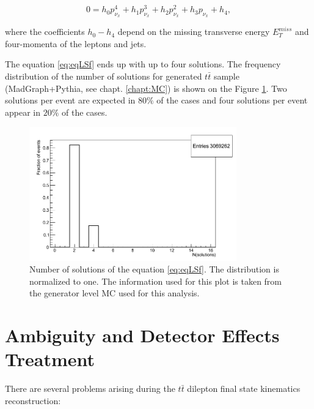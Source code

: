 \begin{equation}\label{eq:eqLSf}
 0 = h_{0} p_{\nu_{x}}^{4} + h_{1} p_{\nu_{x}}^{3} + h_{2} p_{\nu_{x}}^{2} + h_{3} p_{\nu_{x}} + h_{4},
\end{equation}

where the coefficients $h_{0} - h_{4}$ \cite{LSpaper, LSerrat} depend on the missing transverse energy $E_{T}^{miss}$ and four-momenta of the
leptons and jets. 

The equation \ref{eq:eqLSf} ends up with up to four solutions. The frequency distribution of the number of solutions for generated $t\bar{t}$ sample (MadGraph+Pythia,
see chapt. \ref{chapt:MC}) is shown on the Figure \ref{fig:LSNsol}. Two solutions per event are expected in 80$\%$ of the cases and four solutions per event appear in 
$20\%$ of the cases.

\begin{figure}[t]
  \centering
  \includegraphics[width=0.8\textwidth]{05_kinReco/plots/KinReco_Nsolutions.png}
  \caption{Number of solutions of the equation \ref{eq:eqLSf}. The distribution is normalized to one. The information used for this plot is taken
  from the generator level MC used for this analysis.}
  \label{fig:LSNsol}
\end{figure}



\section{Ambiguity and Detector Effects Treatment}\label{sec:SolSer}

There are several problems arising during the $t\bar{t}$ dilepton final state kinematics reconstruction:


